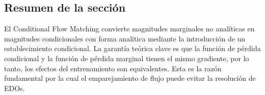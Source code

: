 \subsection{Resumen de la sección}

El Conditional Flow Matching convierte magnitudes marginales no analíticas en magnitudes condicionales con forma analítica mediante la introducción de un establecimiento condicional. La garantía teórica clave es que la función de pérdida condicional y la función de pérdida marginal tienen el mismo gradiente, por lo tanto, los efectos del entrenamiento son equivalentes. Esta es la razón fundamental por la cual el emparejamiento de flujo puede evitar la resolución de EDOs.
